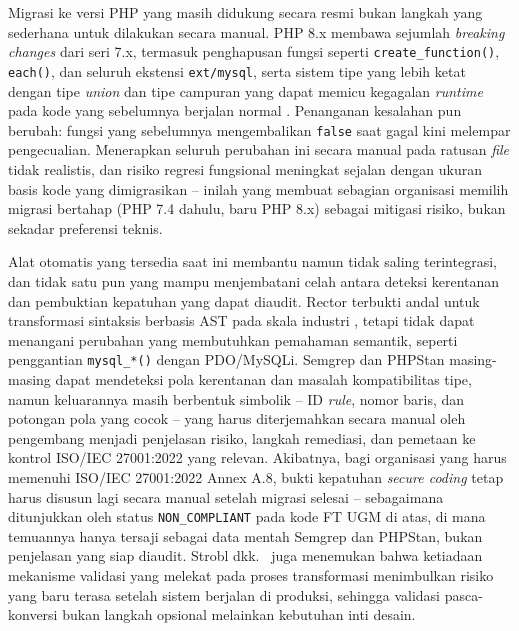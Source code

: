 Migrasi ke versi PHP yang masih didukung secara resmi bukan langkah yang sederhana untuk dilakukan secara manual. PHP 8.x membawa sejumlah \textit{breaking changes} dari seri 7.x, termasuk penghapusan fungsi seperti \texttt{create\_function()}, \texttt{each()}, dan seluruh ekstensi \texttt{ext/mysql}, serta sistem tipe yang lebih ketat dengan tipe \textit{union} dan tipe campuran yang dapat memicu kegagalan \textit{runtime} pada kode yang sebelumnya berjalan normal \cite{phpgroup2022supported}. Penanganan kesalahan pun berubah: fungsi yang sebelumnya mengembalikan \texttt{false} saat gagal kini melempar pengecualian. Menerapkan seluruh perubahan ini secara manual pada ratusan \textit{file} tidak realistis, dan risiko regresi fungsional meningkat sejalan dengan ukuran basis kode yang dimigrasikan -- inilah yang membuat sebagian organisasi memilih migrasi bertahap (PHP 7.4 dahulu, baru PHP 8.x) \cite{phpgroup2022supported} sebagai mitigasi risiko, bukan sekadar preferensi teknis.


Alat otomatis yang tersedia saat ini membantu namun tidak saling 
terintegrasi, dan tidak satu pun yang mampu menjembatani celah antara 
deteksi kerentanan dan pembuktian kepatuhan yang dapat diaudit. 
Rector \cite{rector2024} terbukti andal untuk transformasi sintaksis 
berbasis AST pada skala industri \cite{chen2022ast}, tetapi tidak dapat 
menangani perubahan yang membutuhkan pemahaman semantik, seperti 
penggantian \texttt{mysql\_*()} dengan PDO/MySQLi. Semgrep 
\cite{semgrep2024} dan PHPStan \cite{phpstan2024} masing-masing dapat 
mendeteksi pola kerentanan dan masalah kompatibilitas tipe, namun 
keluarannya masih berbentuk simbolik -- ID \textit{rule}, nomor baris, 
dan potongan pola yang cocok -- yang harus diterjemahkan secara manual 
oleh pengembang menjadi penjelasan risiko, langkah remediasi, dan 
pemetaan ke kontrol ISO/IEC 27001:2022 yang relevan. Akibatnya, bagi 
organisasi yang harus memenuhi ISO/IEC 27001:2022 Annex A.8, bukti 
kepatuhan \textit{secure coding} tetap harus disusun lagi secara manual 
setelah migrasi selesai -- sebagaimana ditunjukkan oleh status 
\texttt{NON\_COMPLIANT} pada kode FT UGM di atas, di mana temuannya 
hanya tersaji sebagai data mentah Semgrep dan PHPStan, bukan penjelasan 
yang siap diaudit. Strobl dkk.~\cite{strobl2020automated} juga 
menemukan bahwa ketiadaan mekanisme validasi yang melekat pada proses 
transformasi menimbulkan risiko yang baru terasa setelah sistem berjalan 
di produksi, sehingga validasi pasca-konversi bukan langkah opsional 
melainkan kebutuhan inti desain.

